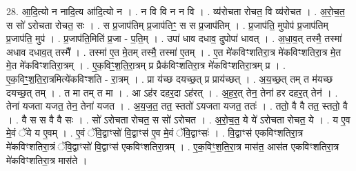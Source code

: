 \documentclass[17pt]{extarticle}
\begin{document}
28. आ॒दि॒त्यो न नादि॒त्य आ॑दि॒त्यो न । . न वि वि न न वि । . व्य॑रोचता रोचत॒ वि व्य॑रोचत । . अ॒रो॒च॒त॒ स सो॑ ऽरोचता रोचत॒ सः । . स प्र॒जाप॑तिम् प्र॒जाप॑तिꣳ॒॒ स स प्र॒जाप॑तिम् । . प्र॒जाप॑ति॒ मुपोप॑ प्र॒जाप॑तिम् प्र॒जाप॑ति॒ मुप॑ । . प्र॒जाप॑ति॒मिति॑ प्र॒जा - प॒ति॒म् । . उपा॑ धाव दधाव॒ दुपोपा॑ धावत् । . अ॒धा॒व॒त् तस्मै॒ तस्मा॑ अधाव दधाव॒त् तस्मै᳚ । . तस्मा॑ ए॒त मे॒तम् तस्मै॒ तस्मा॑ ए॒तम् । . ए॒त मे॑कविꣳशतिरा॒त्र मे॑कविꣳशतिरा॒त्र मे॒त मे॒त मे॑कविꣳशतिरा॒त्रम् । . ए॒क॒विꣳ॒॒श॒ति॒रा॒त्रम् प्र प्रैक॑विꣳशतिरा॒त्र मे॑कविꣳशतिरा॒त्रम् प्र । . ए॒क॒विꣳ॒॒श॒ति॒रा॒त्रमित्ये॑कविꣳशति - रा॒त्रम् । . प्रा य॑च्छ दयच्छ॒त् प्र प्राय॑च्छत् । . अ॒य॒च्छ॒त् तम् त म॑यच्छ दयच्छ॒त् तम् । . त मा तम् त मा । . आ ऽह॑र दहर॒दा ऽह॑रत् । . अ॒ह॒र॒त् तेन॒ तेना॑ हर दहर॒त् तेन॑ । . तेना॑ यजता यजत॒ तेन॒ तेना॑ यजत । . अ॒य॒ज॒त॒ तत॒ स्ततो॑ ऽयजता यजत॒ ततः॑ । . ततो॒ वै वै तत॒ स्ततो॒ वै । . वै स स वै वै सः । . सो॑ ऽरोचता रोचत॒ स सो॑ ऽरोचत । . अ॒रो॒च॒त॒ ये ये॑ ऽरोचता रोचत॒ ये । . य ए॒व मे॒वं ॅये य ए॒वम् । . ए॒वं ॅवि॒द्वाꣳसो॑ वि॒द्वाꣳस॑ ए॒व मे॒वं ॅवि॒द्वाꣳसः॑ । . वि॒द्वाꣳस॑ एकविꣳशतिरा॒त्र मे॑कविꣳशतिरा॒त्रं ॅवि॒द्वाꣳसो॑ वि॒द्वाꣳस॑ एकविꣳशतिरा॒त्रम् । . ए॒क॒विꣳ॒॒श॒ति॒रा॒त्र मास॑त॒ आस॑त एकविꣳशतिरा॒त्र मे॑कविꣳशतिरा॒त्र मास॑ते । \newline
\end{document}
